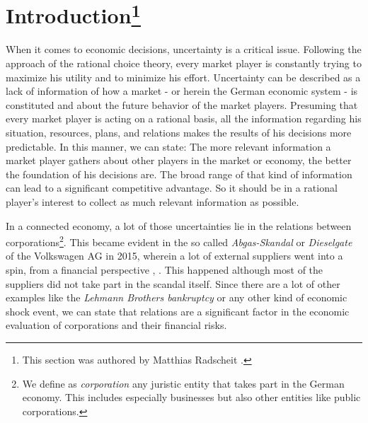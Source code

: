 \section*{Introduction\footnote{This section was authored by Matthias Radscheit \cite{loeperradscheit}.}}
\label{sec:Introduction}
When it comes to economic decisions, uncertainty is a critical issue. Following the approach of the rational choice theory, every market player is constantly trying to maximize his utility and to minimize his effort. Uncertainty can be described as a lack of information of how a market - or herein the German economic system - is constituted and about the future behavior of the market players. Presuming that every market player is acting on a rational basis, all the information regarding his situation, resources, plans, and relations makes the results of his decisions more predictable. In this manner, we can state: The more relevant information a market player gathers about other players in the market or economy, the better the foundation of his decisions are. The broad range of that kind of information can lead to a significant competitive advantage. So it should be in a rational player's interest to collect as much relevant information as possible.\par
In a connected economy, a lot of those uncertainties lie in the relations between corporations\footnote{We define as \emph{corporation} any juristic entity that takes part in the German economy. This includes especially businesses but also other entities like public corporations.}. This became evident in the so called \emph{Abgas-Skandal} or \emph{Dieselgate} of the Volkswagen AG in 2015, wherein a lot of external suppliers went into a spin, from a financial perspective \cite{stuttzeit}, \cite{automobilwoche}. This happened although most of the suppliers did not take part in the scandal itself. Since there are a lot of other examples like the \emph{Lehmann Brothers bankruptcy} or any other kind of economic shock event, we can state that relations are a significant factor in the economic evaluation of corporations and their financial risks.\par

